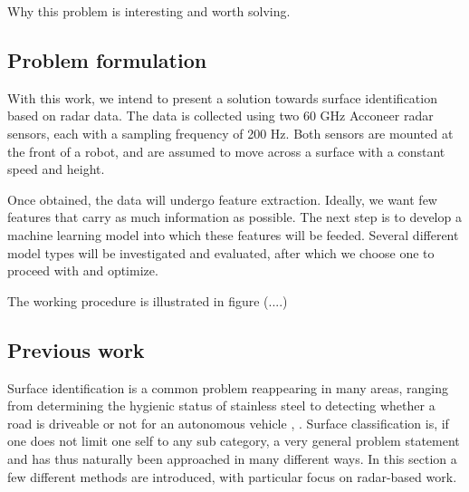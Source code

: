 Why this problem is interesting and worth solving.

\subsection{Problem formulation}
With this work, we intend to present a solution towards surface identification based on radar data. The data is collected using two 60 GHz Acconeer radar sensors, each with a sampling frequency of 200 Hz. Both sensors are mounted at the front of a robot, and are assumed to move across a surface with a constant speed and height.

Once obtained, the data will undergo feature extraction. Ideally, we want few features that carry as much information as possible. The next step is to develop a machine learning model into which these features will be feeded. Several different model types will be investigated and evaluated, after which we choose one to proceed with and optimize. 

The working procedure is illustrated in figure (....)



\subsection{Previous work}

Surface identification is a common problem reappearing in many areas, ranging from determining the hygienic status of stainless steel \citep{jullien_bénézech_carpentier_lebret_faille_2003} to detecting whether a road is driveable or not for an autonomous vehicle \citep{guo_gerasimov_poulton_2006}, \citep{bystrov_2016}. Surface classification is, if one does not limit one self to any sub category, a very general problem statement and has thus naturally been approached in many different ways. In this section a few different methods are introduced, with particular focus on radar-based work. 


